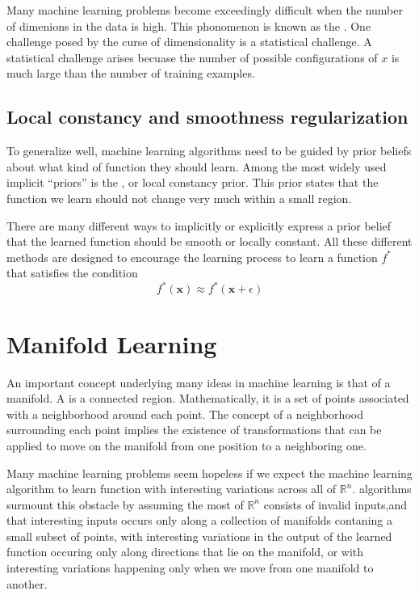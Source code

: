 Many machine learning problems become exceedingly difficult when the number of dimenions in the data is high.
This phonomenon is known as the .
One challenge posed by the curse of dimensionality is a statistical challenge.
A statistical challenge arises becuase the number of possible configurations of $x$ is much large than the number of training examples.


\subsection{Local constancy and smoothness regularization}

To generalize well, machine learning algorithms need to be guided by prior beliefs about what kind of function they should learn.
Among the most widely used implicit ``priors'' is the , or local constancy prior.
This prior states that the function we learn should not change very much within a small region.

There are many different ways to implicitly or explicitly express a prior belief that the learned function should be smooth or locally constant.
All these different methods are designed to encourage the learning process to learn a function $f^{*}$ that satisfies the condition
\begin{equation}
  f^{*}(\bm{x}) \approx f^{*}(\bm{x} + \epsilon)
\end{equation}

\section{Manifold Learning}

An important concept underlying many ideas in machine learning is that of a manifold.
A  is a connected region.
Mathematically, it is a set of points associated with a neighborhood around each point.
The concept of a neighborhood surrounding each point implies the existence of transformations that can be applied to move on the manifold from one position to a neighboring one.


Many machine learning problems seem hopeless if we expect the machine learning algorithm to learn function with interesting variations across all of $\mathbb{R}^n$.
 algorithms surmount this obstacle by assuming
the most of $\mathbb{R}^n$ consists of invalid inputs,and that
interesting inputs occurs only along a collection of manifolds contaning a small subset of points,
with interesting variations in the output of the learned function occuring only along directions that lie on the manifold,
or with interesting variations happening only when we move from one manifold to another.


